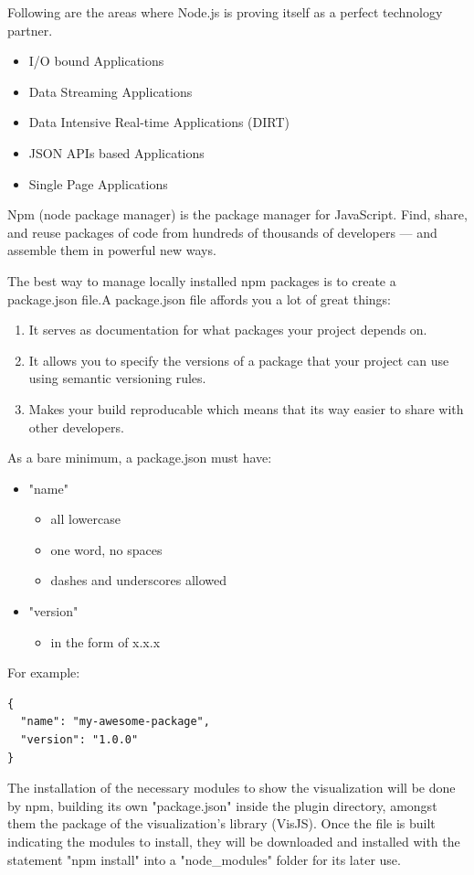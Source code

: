 \documentclass[a4paper, 12pt]{book}
\begin{document}
Following are the areas where Node.js is proving itself as a perfect technology partner.
\begin{itemize}
\item I/O bound Applications
\item Data Streaming Applications
\item Data Intensive Real-time Applications (DIRT)
\item JSON APIs based Applications
\item Single Page Applications
\end{itemize}


Npm (node package manager) is the package manager for JavaScript. Find, share, and reuse packages of code from hundreds of thousands of developers — and assemble them in powerful new ways. 

The best way to manage locally installed npm packages is to create a package.json file.A package.json file affords you a lot of great things:
\begin{enumerate}
\item It serves as documentation for what packages your project depends on.
\item It allows you to specify the versions of a package that your project can use using semantic versioning rules.
\item Makes your build reproducable which means that its way easier to share with other developers.
\end{enumerate}

As a bare minimum, a package.json must have:
\begin{itemize}
\item "name"
\begin{itemize}
\item all lowercase
\item one word, no spaces
\item dashes and underscores allowed
\end{itemize}
\item "version"
\begin{itemize}
\item in the form of x.x.x
\end{itemize}
\end{itemize}

For example:
\begin{lstlisting}[frame=single]
{
  "name": "my-awesome-package",
  "version": "1.0.0"
}
\end{lstlisting}

The installation of the necessary modules to show the visualization will be done by npm, building its own "package.json" inside the plugin directory, amongst them the package of the visualization’s library (VisJS).  Once the file is built indicating the modules to install, they will be downloaded and installed with the statement "npm install" into a "node\_modules" folder for its later use.
\end{document}

